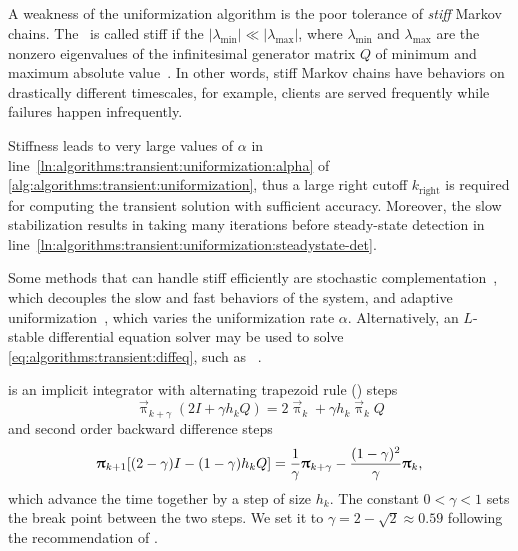\subsection{}
\label{ssec:algorithms:trbdf2}

A weakness of the uniformization algorithm is the poor tolerance of
\emph{stiff} Markov chains. The \CTMC\ is called stiff if the
$\lvert \lambda_{\min} \rvert \ll \lvert \lambda_{\max} \rvert$, where
$\lambda_{\min}$ and $\lambda_{\max}$ are the nonzero eigenvalues of
the infinitesimal generator matrix $Q$ of minimum and maximum absolute
value~\citep{DBLP:journals/cor/ReibmanT88}. In other words, stiff
Markov chains have behaviors on drastically different timescales, for
example, clients are served frequently while failures happen
infrequently.

Stiffness leads to very large values of $\alpha$ in
line~\ref{ln:algorithms:transient:uniformization:alpha} of
\vref{alg:algorithms:transient:uniformization}, thus a large right
cutoff $k_{\text{right}}$ is required for computing the transient
solution with sufficient accuracy. Moreover, the slow stabilization
results in taking many iterations before steady-state detection in
line~\ref{ln:algorithms:transient:uniformization:steadystate-det}.

Some methods that can handle stiff  efficiently are
stochastic complementation~\citep{meyer1989stochastic}, which
decouples the slow and fast behaviors of the system, and adaptive
uniformization~\citep{van1994adaptive}, which varies the uniformization
rate $\alpha$. Alternatively, an $L$-stable differential equation
solver may be used to solve \cref{eq:algorithms:transient:diffeq}, such as
\mbox{}~\citep{DBLP:journals/cor/ReibmanT88,%
DBLP:journals/tcad/BankCFGRS85}.

 is an implicit integrator with alternating trapezoid
rule () steps
\begin{equation}
  \vec{\uppi}_{k + \gamma} (2I + \gamma h_k Q) = 2 \vec{\uppi}_{k} +
  \gamma h_k \vec{\uppi}_k Q
\end{equation}
and second order backward difference steps
\begin{equation}
  \vec{\uppi}_{k + 1} [(2 - \gamma) I - (1 - \gamma) h_k Q] =
  \frac{1}{\gamma} \vec{\uppi}_{k + \gamma} - \frac{(1 -
    \gamma)^2}{\gamma} \vec{\uppi}_k \text,
\end{equation}
which advance the time together by a step of size $h_k$. The constant
$0 < \gamma < 1$ sets the break point between the two steps. We set it
to $\gamma = 2 - \sqrt{2} \approx 0.59$ following the recommendation
of \citet{DBLP:journals/tcad/BankCFGRS85}.

